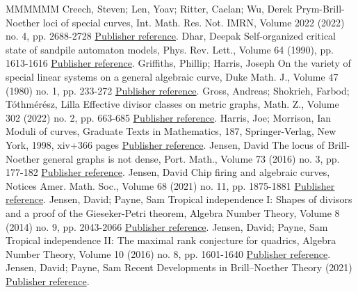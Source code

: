 \documentclass[11pt]{article}
\theoremstyle{definition}
\numberwithin{equation}{section}
\begin{document}
\begin{thebibliography}{MMMMMM}
 Creech, Steven; Len, Yoav; Ritter, Caelan; Wu, Derek Prym-Brill-Noether loci of special curves, Int. Math. Res. Not. IMRN, Volume 2022 (2022) no. 4, pp. 2688-2728 \href{https://alco.centre-mersenne.org/articles/10.5802/alco.443/#CLRW}{Publisher reference}.
 Dhar, Deepak Self-organized critical state of sandpile automaton models, Phys. Rev. Lett., Volume 64 (1990), pp. 1613-1616 \href{https://alco.centre-mersenne.org/articles/10.5802/alco.443/#Dhar90}{Publisher reference}.
 Griffiths, Phillip; Harris, Joseph On the variety of special linear systems on a general algebraic curve, Duke Math. J., Volume 47 (1980) no. 1, pp. 233-272 \href{https://alco.centre-mersenne.org/articles/10.5802/alco.443/#gh80}{Publisher reference}.
 Gross, Andreas; Shokrieh, Farbod; Tóthmérész, Lilla Effective divisor classes on metric graphs, Math. Z., Volume 302 (2022) no. 2, pp. 663-685 \href{https://alco.centre-mersenne.org/articles/10.5802/alco.443/#GSTSemibreak}{Publisher reference}.
 Harris, Joe; Morrison, Ian Moduli of curves, Graduate Texts in Mathematics, 187, Springer-Verlag, New York, 1998, xiv+366 pages \href{https://alco.centre-mersenne.org/articles/10.5802/alco.443/#HarrisMorrison}{Publisher reference}.
 Jensen, David The locus of Brill-Noether general graphs is not dense, Port. Math., Volume 73 (2016) no. 3, pp. 177-182 \href{https://alco.centre-mersenne.org/articles/10.5802/alco.443/#jensenNotDense}{Publisher reference}.
 Jensen, David Chip firing and algebraic curves, Notices Amer. Math. Soc., Volume 68 (2021) no. 11, pp. 1875-1881 \href{https://alco.centre-mersenne.org/articles/10.5802/alco.443/#jensenNotices}{Publisher reference}.
 Jensen, David; Payne, Sam Tropical independence I: Shapes of divisors and a proof of the Gieseker-Petri theorem, Algebra Number Theory, Volume 8 (2014) no. 9, pp. 2043-2066 \href{https://alco.centre-mersenne.org/articles/10.5802/alco.443/#JensenPayneTP1}{Publisher reference}.
 Jensen, David; Payne, Sam Tropical independence II: The maximal rank conjecture for quadrics, Algebra Number Theory, Volume 10 (2016) no. 8, pp. 1601-1640 \href{https://alco.centre-mersenne.org/articles/10.5802/alco.443/#JensenPayneTP2}{Publisher reference}.
 Jensen, David; Payne, Sam Recent Developments in Brill–Noether Theory (2021) \href{https://alco.centre-mersenne.org/articles/10.5802/alco.443/#jensen2021recent}{Publisher reference}.

\end{thebibliography}
\end{document}
